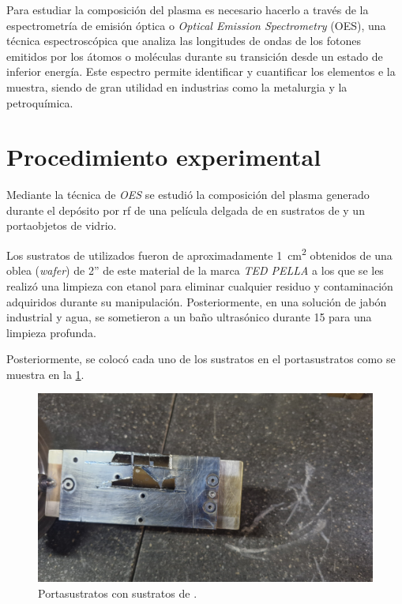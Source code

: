 \documentclass[12pt]{IEEEtran}
\begin{document}
Para estudiar la composición del plasma es necesario hacerlo a través de la espectrometría de emisión óptica o \emph{Optical Emission Spectrometry} (OES), una técnica espectroscópica que analiza las longitudes de ondas de los fotones emitidos por los átomos o moléculas durante su transición desde un estado de inferior energía. Este espectro permite identificar y cuantificar los elementos e la muestra, siendo de gran utilidad en industrias como la metalurgia y la petroquímica.\cite{QueEsAnalisis,AnalisisPorEmision2025}

\section{Procedimiento experimental}

Mediante la técnica de \emph{OES} se estudió la composición del plasma
generado durante el depósito por rf de una película delgada de 
en sustratos de  y un portaobjetos de vidrio.

Los sustratos de  utilizados fueron de aproximadamente \qty{1}{\cm\squared}
obtenidos de una oblea (\emph{wafer}) de 2'' de este material de la marca \emph{TED PELLA}
a los que se les realizó una limpieza con etanol
para eliminar cualquier residuo y contaminación adquiridos durante su manipulación.
Posteriormente, en una solución de jabón industrial y agua,
se sometieron a un baño ultrasónico durante \qty{15}{\min} para una limpieza profunda.

Posteriormente, se colocó cada uno de los sustratos en el portasustratos
como se muestra en la \cref{fig:portasustratos-setup}.

\begin{figure}[htb]
	\centering
	\includegraphics[width=\linewidth, trim={0 20cm 50cm 20cm},clip]{portasustratos.jpg}
	\caption{Portasustratos con sustratos de .}
	\label{fig:portasustratos-setup}
\end{figure}
\end{document}

